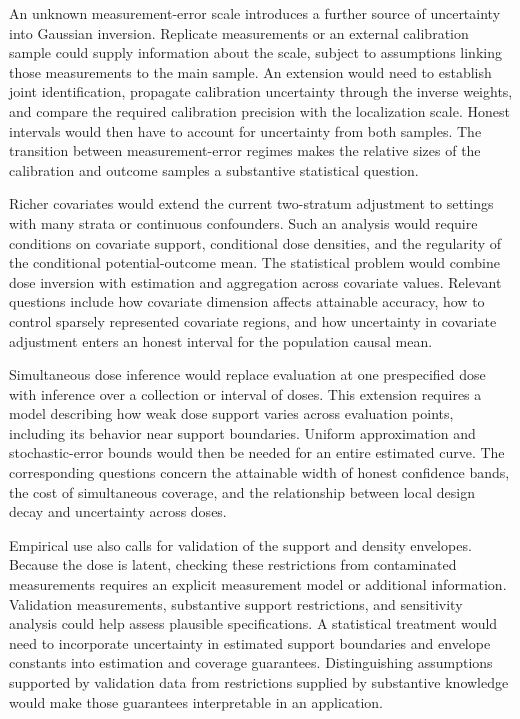\documentclass[11pt]{article}
\begin{document}
An unknown measurement-error scale introduces a further source of uncertainty into Gaussian inversion. Replicate measurements or an external calibration sample could supply information about the scale, subject to assumptions linking those measurements to the main sample. An extension would need to establish joint identification, propagate calibration uncertainty through the inverse weights, and compare the required calibration precision with the localization scale. Honest intervals would then have to account for uncertainty from both samples. The transition between measurement-error regimes makes the relative sizes of the calibration and outcome samples a substantive statistical question.

Richer covariates would extend the current two-stratum adjustment to settings with many strata or continuous confounders. Such an analysis would require conditions on covariate support, conditional dose densities, and the regularity of the conditional potential-outcome mean. The statistical problem would combine dose inversion with estimation and aggregation across covariate values. Relevant questions include how covariate dimension affects attainable accuracy, how to control sparsely represented covariate regions, and how uncertainty in covariate adjustment enters an honest interval for the population causal mean.

Simultaneous dose inference would replace evaluation at one prespecified dose with inference over a collection or interval of doses. This extension requires a model describing how weak dose support varies across evaluation points, including its behavior near support boundaries. Uniform approximation and stochastic-error bounds would then be needed for an entire estimated curve. The corresponding questions concern the attainable width of honest confidence bands, the cost of simultaneous coverage, and the relationship between local design decay and uncertainty across doses.

Empirical use also calls for validation of the support and density envelopes. Because the dose is latent, checking these restrictions from contaminated measurements requires an explicit measurement model or additional information. Validation measurements, substantive support restrictions, and sensitivity analysis could help assess plausible specifications. A statistical treatment would need to incorporate uncertainty in estimated support boundaries and envelope constants into estimation and coverage guarantees. Distinguishing assumptions supported by validation data from restrictions supplied by substantive knowledge would make those guarantees interpretable in an application.
\end{document}

